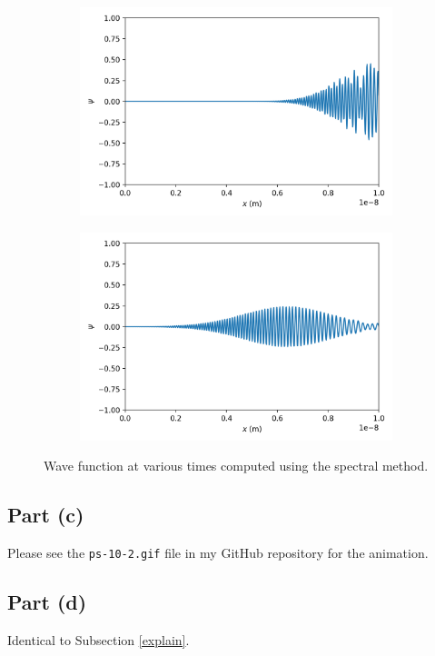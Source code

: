 \documentclass[11pt]{article}
\begin{document}
\begin{figure}[H]
    \begin{subfigure}[H]{0.48\textwidth}
        \centering
        \includegraphics[width=\textwidth]{Figs/ps-10-2-2.png}
    \end{subfigure}
    \hfill
    \begin{subfigure}[H]{0.48\textwidth}
        \centering
        \includegraphics[width=\textwidth]{Figs/ps-10-2-3.png}
    \end{subfigure}
    \caption{Wave function at various times computed using the spectral method.}
    \label{fig:spectral}
\end{figure}

\subsection{Part (c)}
Please see the \texttt{ps-10-2.gif} file in my GitHub repository for the animation.

\subsection{Part (d)}
Identical to Subsection \ref{explain}.
\end{document}
